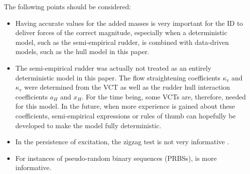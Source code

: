 The following points should be considered:
\begin{itemize}
    \item Having accurate values for the added masses is very important for the ID to deliver forces of the correct magnitude, especially when a deterministic model, such as the semi-empirical rudder, is combined with data-driven models, such as the hull model in this paper. 
    \item The semi-empirical rudder was actually not treated as an entirely deterministic model in this paper. The flow straightening coefficients $\kappa_v$ and $\kappa_r$ were determined from the VCT as well as the rudder hull interaction coefficients $a_H$ and $x_H$. For the time being, some VCTs are, therefore, needed for this model. In the future, when more experience is gained about these coefficients, semi-empirical expressions or rules of thumb can hopefully be developed to make the model fully deterministic.
    \item In the persistence of excitation, the zigzag test is not very informative \citep{sutulo_algorithm_2014}.
    \item For instances of pseudo-random binary sequences (PRBSs), \citep{landau_digital_2006} is more informative.
\end{itemize}